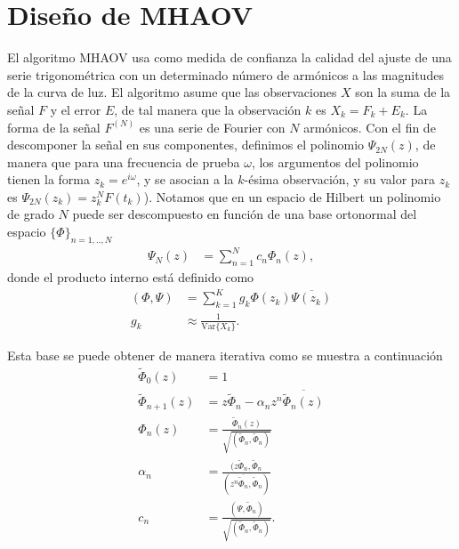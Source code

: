 \section{Diseño de MHAOV}\label{sec:arquitectura-mhaov}

El algoritmo MHAOV usa como medida de confianza la calidad del ajuste de una serie trigonométrica con un determinado número de armónicos a las magnitudes de la curva de luz. El algoritmo asume que las observaciones $X$ son la suma de la señal $F$ y el error $E$, de tal manera que la observación $k$ es $X_k= F_k+E_k$. La forma de la señal $F^{(N)}$ es una serie de Fourier con $N$ armónicos. Con el fin de descomponer la señal en sus componentes, definimos el polinomio $\Psi_{2N}(z)$, de manera que para una frecuencia de prueba $\omega$, los argumentos del polinomio tienen la forma $z_k = e^{i \omega}$, y se asocian a la $k$-ésima observación, y su valor para $z_k$  es $\Psi_{2N}(z_k)=z_k^N F(t_k)$). Notamos que en un espacio de Hilbert un polinomio de grado $N$ puede ser descompuesto en función de una base ortonormal del espacio $\{\Phi\}_{n=1,..,N}$
\begin{align}
    \Psi_N(z) &= \sum_{n=1}^{N} c_n \Phi_n(z)
,\end{align}
donde el producto interno está definido como
\begin{align}
    (\Phi, \Psi) &= \sum_{k=1}^{K} g_k \Phi(z_k) \overline {\Psi(z_k)} \label{eq:scalar-product}\\
    g_k &\approx \frac{1}{\mbox{Var}\{X_k\}} \nonumber 
.\end{align}

Esta base se puede obtener de manera iterativa como se muestra a continuación
\begin{align}
    \tilde{ \Phi }_0(z)  &= 1 \\
    \tilde{ \Phi }_{n+1}(z)  &= z \tilde{ \Phi}_n-\alpha_n z^n \overline{\tilde{\Phi}_n(z) } \label{eq:recurrence} \\ 
\Phi_n(z) &= \frac{\tilde{ \Phi}_n(z) }{\sqrt{(\tilde{\Phi}_n, \tilde{\Phi}_n)}}\\
\alpha_n &= \frac{(z\tilde{\Phi}_n, \tilde{\Phi}_n }{(z^n \overline{\tilde{\Phi}_n}, \tilde{\Phi}_n)} \label{eq:alpha} \\
c_n &= \frac{(\Psi, \tilde{\Phi}_n)}{\sqrt{(\tilde{\Phi}_n, \tilde{\Phi}_n)}} \label{eq:c}
.\end{align}

